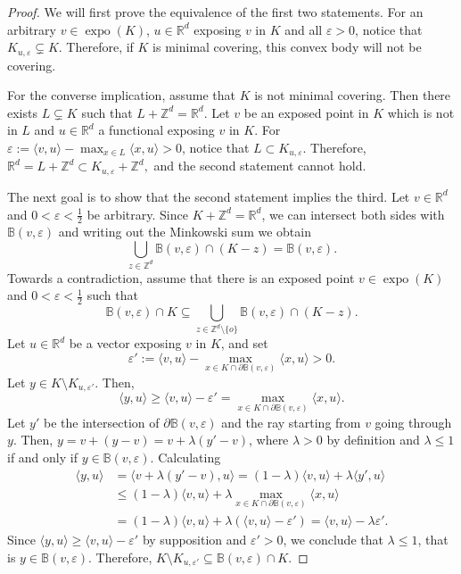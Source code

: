 \documentclass[10pt,a4paper]{amsart}
\DeclareMathOperator{\expo}{expo}
\newcommand{\RR}{\mathbb{R}}
\newcommand{\ZZ}{\mathbb{Z}}
\newcommand{\ball}{\mathbb{B}}
\newcommand{\origin}{o}
\begin{document}
\begin{proof} 
We will first prove the equivalence of the first two statements.
For an arbitrary $v\in \expo(K)$, $u\in \RR^d$ exposing $v$ in $K$ and all $\varepsilon>0$, notice that $K_{u,\varepsilon}\subsetneq K$. Therefore, if $K$ is minimal covering, this convex body will not be covering.

For the converse implication, assume that $K$ is not minimal covering. Then there exists $L\subsetneq K$ such that $L+\ZZ^d=\RR^d$. Let $v$ be an exposed point in $K$ which is not in $L$ and $u\in \RR^d$ a functional exposing $v$ in $K$. For $\varepsilon:=\langle v,u\rangle-\max_{x\in L}\langle x,u\rangle>0$, notice that $L\subset K_{u,\varepsilon}$. Therefore, $\RR^d=L+\ZZ^d\subset K_{u,\varepsilon}+\ZZ^d,$ and the second statement cannot hold.

The next goal is to show that the second statement implies the third. 
Let $v\in \RR^d$ and $0<\varepsilon<\frac{1}{2}$ be arbitrary. Since $K+\ZZ^d=\RR^d$, we can intersect both sides with $\ball(v, \varepsilon)$ and writing out the Minkowski sum we obtain 
\[
\bigcup \limits_{z\in \ZZ^d} \ball (v, \varepsilon)\cap (K-z)=\ball(v,\varepsilon).
\]
 Towards a contradiction, assume that there is an exposed point $v\in \expo(K)$ and $0<\varepsilon<\frac{1}{2}$ such that
\begin{equation}\label{eq:balls_contradiction}
\ball(v,\varepsilon)\cap K \subseteq\bigcup \limits_{z\in \ZZ^d\setminus \{\origin\}} \ball (v, \varepsilon)\cap (K-z).
\end{equation}
\noindent Let $u\in \RR^d$ be a vector exposing $v$ in $K$, and set 
\[
\varepsilon':= \langle v,u\rangle-\max_{x\in K\cap \partial \ball(v,\varepsilon)}\langle x,u\rangle>0.
\]
Let $y\in K\setminus K_{u, \varepsilon'}$. Then, \[
\langle y,u\rangle \geq \langle v,u\rangle-\varepsilon'=\max_{x\in K\cap \partial \ball(v,\varepsilon)}\langle x,u\rangle.
\]
 Let $y'$ be the intersection of $\partial\ball(v, \varepsilon)$ and the ray starting from $v$ going through $y$. Then, $y=v+(y-v)=v+\lambda(y'-v)$, where $\lambda>0$ by definition and $\lambda\leq 1$ if and only if $y\in \ball(v, \varepsilon)$.
Calculating
\[
\begin{split}
\langle y,u\rangle &= \langle v+\lambda(y'-v) , u \rangle = (1-\lambda)\langle v,u\rangle +\lambda \langle y',u\rangle\\
& \leq (1-\lambda)\langle v,u\rangle + \lambda\max_{x\in K\cap \partial \ball(v,\varepsilon)} \langle x,u\rangle \\
&=(1-\lambda)\langle v,u\rangle+\lambda(\langle v,u\rangle-\varepsilon')=\langle v,u\rangle-\lambda\varepsilon'.
\end{split}
\]
Since $\langle y,u\rangle\geq\langle v,u\rangle - \varepsilon'$ by supposition and $\varepsilon'>0$, we conclude that $\lambda\leq 1$, that is $y\in \ball(v,\varepsilon)$. Therefore, $K\setminus K_{u,\varepsilon'}\subseteq \ball(v,\varepsilon)\cap K$.


\end{proof}
\end{document}
